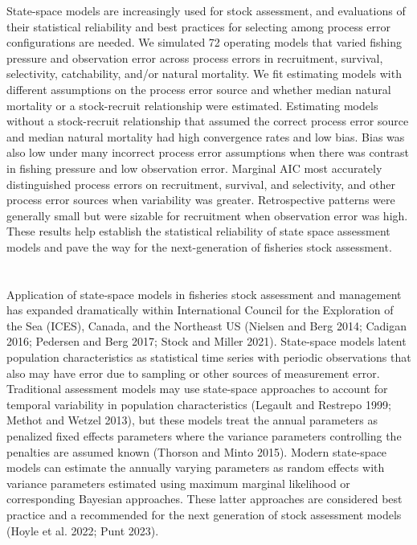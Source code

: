\documentclass[
  12pt,
]{article}
\providecommand{\DIFadd}[1]{{\protect\color{blue}\uwave{#1}}} %
\providecommand{\DIFaddbegin}{} %
\providecommand{\DIFaddend}{} %
\providecommand{\DIFdelbegin}{} %
\providecommand{\DIFdelend}{} %
\newcommand{\DIFscaledelfig}{0.5}
\newlength{\DIFdelgraphicswidth} %
\newlength{\DIFdelgraphicsheight} %
\newcommand{\DIFaddincludegraphics}[2][]{{\color{blue}\fbox{\DIFOincludegraphics[#1]{#2}}}} %
\newcommand{\DIFdelincludegraphics}[2][]{%
\sbox{\DIFdelgraphicsbox}{\DIFOincludegraphics[#1]{#2}}%
\settoboxwidth{\DIFdelgraphicswidth}{\DIFdelgraphicsbox} %
\settoboxtotalheight{\DIFdelgraphicsheight}{\DIFdelgraphicsbox} %
\scalebox{\DIFscaledelfig}{%
\parbox[b]{\DIFdelgraphicswidth}{\usebox{\DIFdelgraphicsbox}\\[-\baselineskip] \rule{\DIFdelgraphicswidth}{0em}}\llap{\resizebox{\DIFdelgraphicswidth}{\DIFdelgraphicsheight}{%
\setlength{\unitlength}{\DIFdelgraphicswidth}%
\begin{picture}(1,1)%
\thicklines\linethickness{2pt} %
{\color[rgb]{1,0,0}\put(0,0){\framebox(1,1){}}}%
{\color[rgb]{1,0,0}\put(0,0){\line( 1,1){1}}}%
{\color[rgb]{1,0,0}\put(0,1){\line(1,-1){1}}}%
\end{picture}%
}\hspace*{3pt}}} %
} %
\DeclareRobustCommand{\DIFaddbegin}{\DIFOaddbegin \let\includegraphics\DIFaddincludegraphics} %
\DeclareRobustCommand{\DIFaddend}{\DIFOaddend \let\includegraphics\DIFOincludegraphics} %
\DeclareRobustCommand{\DIFdelbegin}{\DIFOdelbegin \let\includegraphics\DIFdelincludegraphics} %
\DeclareRobustCommand{\DIFdelend}{\DIFOaddend \let\includegraphics\DIFOincludegraphics} %
\begin{document}
State-space models are increasingly used for stock assessment, and
evaluations of their statistical reliability and best practices for
selecting among process error configurations are needed. We simulated 72
operating models that varied fishing pressure and observation error
across process errors in recruitment, survival, selectivity,
catchability, and/or natural mortality. We fit estimating models with
different assumptions on the process error source and whether median
natural mortality or a stock-recruit relationship were estimated.
Estimating models without a stock-recruit relationship that assumed the
correct process error source and median natural mortality had high
convergence rates and low bias. Bias was also low under many incorrect
process error assumptions when there was contrast in fishing pressure
and low observation error. Marginal AIC most accurately distinguished
process errors on recruitment, survival, and selectivity, and other
process error sources when variability was greater. Retrospective
patterns were generally small but were sizable for recruitment when
observation error was high. These results help establish the statistical
reliability of state space assessment models and pave the way for the
next-generation of fisheries stock assessment.

\pagebreak

\DIFdelbegin %
\DIFdelend \DIFaddbegin \section*{\DIFadd{Introduction}}\label{introduction}
\DIFaddend {}

Application of state-space models in fisheries stock assessment and
management has expanded dramatically within International Council for
the Exploration of the Sea (ICES), Canada, and the Northeast US (Nielsen
and Berg 2014; Cadigan 2016; Pedersen and Berg 2017; Stock and Miller
2021). State-space models latent population characteristics as
statistical time series with periodic observations that also may have
error due to sampling or other sources of measurement error. Traditional
assessment models may use state-space approaches to account for temporal
variability in population characteristics (Legault and Restrepo 1999;
Methot and Wetzel 2013), but these models treat the annual parameters as
penalized fixed effects parameters where the variance parameters
controlling the penalties are assumed known (Thorson and Minto 2015).
Modern state-space models can estimate the annually varying parameters
as random effects with variance parameters estimated using maximum
marginal likelihood or corresponding Bayesian approaches. These latter
approaches are considered best practice and a recommended for the next
generation of stock assessment models (Hoyle et al. 2022; Punt 2023).
\end{document}
